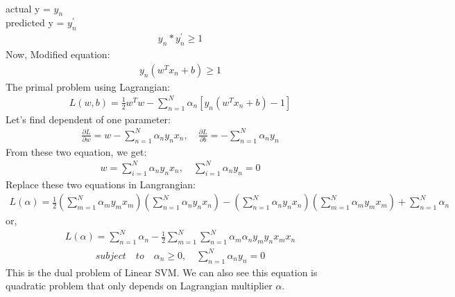 \documentclass[fleqn]{article}
\begin{document}
\\
actual y = $y_{n}$
\\
predicted y = $y_{n}^{'}$
\begin{align*}
y_{n}*y_{n}^{'} \geq 1
\end{align*}
Now, Modified equation:
\begin{align*}
y_{n}(w^{T}x_{n} + b) \geq 1
\end{align*}
The primal problem using Lagrangian:
\begin{align*}
L(w, b) = \frac{1}{2}w^{T}w - \sum_{n=1}^N \alpha_{n} [y_{n}(w^{T}x_{n} + b) - 1]
\end{align*}
Let's find dependent of one parameter:
\begin{align*}
\frac{\partial L}{\partial w} = w -  \sum_{n=1}^N \alpha_{n}y_{n}x_{n},\quad \frac{\partial L}{\partial b} = -\sum_{n=1}^N \alpha_{n}y_{n} 
\end{align*}
From these two equation, we get:
\begin{align*}
w = \sum_{i=1}^N \alpha_{n}y_{n}x_{n},\quad \sum_{i=1}^N \alpha_{n}y_{n} = 0
\end{align*}
Replace these two equations in Langrangian:
\begin{align*}
L(\alpha) = \frac{1}{2}(\sum_{m=1}^N \alpha_{m}y_{m}x_{m})(\sum_{n=1}^N \alpha_{n}y_{n}x_{n}) - (\sum_{n=1}^N \alpha_{n}y_{n}x_{n}) (\sum_{m=1}^N \alpha_{m}y_{m}x_{m}) + \sum_{n=1}^{N} \alpha_{n}    
\end{align*}
or,
\begin{align*}
L(\alpha) = \sum_{n=1}^{N} \alpha_{n} - \frac{1}{2} \sum_{m=1}^{N}\sum_{n=1}^{N} \alpha_{m}\alpha_{n}y_{m}y_{n}x_{m}x_{n}
\end{align*}
\begin{align*}
subject\quad to\quad \alpha_{n} \geq 0,\quad \sum_{n=1}^{N} \alpha_{n}y_{n} = 0
\end{align*}
This is the dual problem of Linear SVM. We can also see this equation is quadratic problem that only depends on Lagrangian multiplier $\alpha$. 
\end{document}
